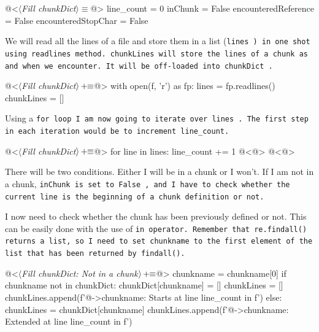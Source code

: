 \begin{code}
@<$\langle$\textit{Fill chunkDict}$\rangle\equiv$@>
line_count = 0
inChunk = False
encounteredReference = False
encounteredStopChar = False

\end{code}

We will read all the lines of a file and store them in a list (\tt lines \rm) in one shot using \tt readlines
\rm method. \tt chunkLines \rm will store the lines of a chunk as and when we encounter. It will be off-loaded
into \tt chunkDict \rm.

\begin{oldcode}
@<$\langle$\textit{Fill chunkDict}$\rangle \thinspace +\!\!\equiv$@>
with open(f, 'r') as fp:
    lines = fp.readlines()
chunkLines = []

\end{oldcode}

Using a \tt for \rm loop I am now going to iterate over \tt lines \rm. The first step in each iteration would
be to increment \verb|line_count|.

\begin{oldcode}
@<$\langle$\textit{Fill chunkDict}$\rangle \thinspace +\!\!\equiv$@>
for line in lines:
    line_count += 1
    @<@>
    @<@>
\end{oldcode}

There will be two conditions. Either I will be in a chunk or I won't. If I am not in a chunk, \tt inChunk \rm
is set to \tt False \rm, and I have to check whether the current line is the beginning of a chunk definition
or not.


I now need to check whether the chunk has been previously defined or not. This can be easily done with the use
of \tt in \rm operator. Remember that \tt re.findall() \rm returns a list, so I need to set \tt chunkname \rm
to the first element of the list that has been returned by \tt findall()\rm.

\begin{oldcode}
@<$\langle$\textit{Fill chunkDict: Not in a chunk}$\rangle \thinspace +\!\!\equiv$@>
        chunkname = chunkname[0]
        if chunkname not in chunkDict:
            chunkDict[chunkname] = []
            chunkLines = []
            chunkLines.append(f'@->{chunkname}: Starts at line {line_count} in {f}\n')
        else:
            chunkLines = chunkDict[chunkname]
            chunkLines.append(f'@->{chunkname}: Extended at line {line_count} in {f}\n')

\end{oldcode}

